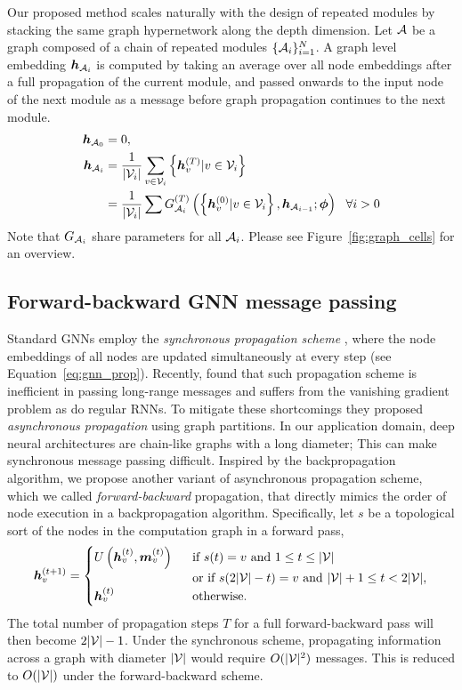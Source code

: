 Our proposed method scales naturally with the design of repeated modules by stacking the same graph
hypernetwork along the depth dimension. Let ${\mathcal{A}}$ be a graph composed of a chain of repeated modules
$\{{\mathcal{A}}_i\}_{i=1}^N$. A graph level embedding ${\bm{h}}_{{\mathcal{A}}_i}$ is computed by taking an average over all
node embeddings after a full propagation of the current module, and passed onwards to the input node
of the next module as a message before graph propagation continues to the next module.
\begin{align}
{\bm{h}}_{{\mathcal{A}}_0} &= 0,\\
{\bm{h}}_{{\mathcal{A}}_i} &= \frac{1}{|{\mathcal{V}}_i|}\sum_{v\in {\mathcal{V}}_i} \left\{{\bm{h}}_v^{(T)} | v \in {\mathcal{V}}_i \right\} \label{eq:agg}\\
            &= \frac{1}{|{\mathcal{V}}_i|}\sum G_{{\mathcal{A}}_i}^{(T)}\left(\left\{{\bm{h}}_v^{(0)} | v \in {\mathcal{V}}_i \right\}, {\bm{h}}_{{\mathcal{A}}_{i-1}}; {\bm{\phi}}\right) \ \ \forall i > 0 \label{eq:next_cell}
\end{align}
Note that $G_{{\mathcal{A}}_i}$ share parameters for all ${\mathcal{A}}_i$.  Please see Figure~\ref{fig:graph_cells} for an overview.

\subsection{Forward-backward GNN message passing}
\label{sec:prop_scheme}
Standard GNNs employ the \textit{synchronous propagation scheme} \citep{li2015gated}, where the node
embeddings of all nodes are updated simultaneously at every step (see Equation~\ref{eq:gnn_prop}).
Recently, \cite{liao2018graph} found that such propagation scheme is inefficient in passing
long-range messages and suffers from the vanishing gradient problem as do regular RNNs. To mitigate
these shortcomings they proposed \textit{asynchronous propagation} using graph partitions. In our
application domain, deep neural architectures are chain-like graphs with a long diameter; This can
make synchronous message passing difficult. Inspired by the backpropagation algorithm, we propose
another variant of asynchronous propagation scheme, which we called \textit{forward-backward}
propagation, that directly mimics the order of node execution in a backpropagation algorithm.
Specifically, let $s$ be a topological sort of the nodes in the computation graph in a forward pass,
\begin{equation}
\label{eq:gnn_prop2}
{\bm{h}}_v^{(t+1)} = 
\begin{cases}
U \left({\bm{h}}_v^{(t)}, {\bm{m}}_v^{(t)} \right) \ \ & \text{if } s(t) = v \text{ and } 1 \le t \le |{\mathcal{V}}|\\
  \ \ & \text{or if } s(2|{\mathcal{V}}| - t) = v \text{ and } |{\mathcal{V}}| + 1 \le t < 2|{\mathcal{V}}|,\\
{\bm{h}}_v^{(t)} \ \ & \text{otherwise}.
\end{cases}
\end{equation}
The total number of propagation steps $T$ for a full forward-backward pass will then become $2|{\mathcal{V}}|-1$. Under the synchronous scheme,  propagating information across a graph with diameter $|{\mathcal{V}}|$ would require $O(|{\mathcal{V}}|^2)$ messages. This is reduced to $O(|{\mathcal{V}}|)$ under the forward-backward scheme.

